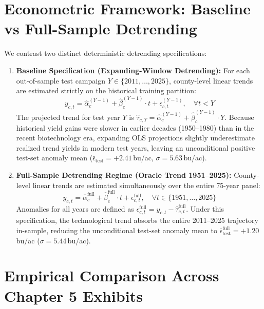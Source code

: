 \documentclass[11pt,a4paper]{article}
\begin{document}
\section{Econometric Framework: Baseline vs Full-Sample Detrending}

We contrast two distinct deterministic detrending specifications:
\begin{enumerate}
    \item \textbf{Baseline Specification (Expanding-Window Detrending):} For each out-of-sample test campaign $Y \in \{2011, \dots, 2025\}$, county-level linear trends are estimated strictly on the historical training partition:
    \begin{equation}
        y_{c,t} = \hat{\alpha}_{c}^{(Y-1)} + \hat{\beta}_{c}^{(Y-1)} \cdot t + \epsilon_{c,t}^{(Y-1)}, \quad \forall t < Y
    \end{equation}
    The projected trend for test year $Y$ is $\hat{\tau}_{c,Y} = \hat{\alpha}_{c}^{(Y-1)} + \hat{\beta}_{c}^{(Y-1)} \cdot Y$. Because historical yield gains were slower in earlier decades (1950--1980) than in the recent biotechnology era, expanding OLS projections slightly underestimate realized trend yields in modern test years, leaving an unconditional positive test-set anomaly mean ($\bar{\epsilon}_{\text{test}} = +2.41$\,bu/ac, $\sigma = 5.63$\,bu/ac).
    
    \item \textbf{Full-Sample Detrending Regime (Oracle Trend 1951--2025):} County-level linear trends are estimated simultaneously over the entire 75-year panel:
    \begin{equation}
        y_{c,t} = \hat{\alpha}_{c}^{\text{full}} + \hat{\beta}_{c}^{\text{full}} \cdot t + \epsilon_{c,t}^{\text{full}}, \quad \forall t \in \{1951, \dots, 2025\}
    \end{equation}
    Anomalies for all years are defined as $\epsilon_{c,t}^{\text{full}} = y_{c,t} - \hat{\tau}_{c,t}^{\text{full}}$. Under this specification, the technological trend absorbs the entire 2011--2025 trajectory in-sample, reducing the unconditional test-set anomaly mean to $\bar{\epsilon}_{\text{test}}^{\text{full}} = +1.20$\,bu/ac ($\sigma = 5.44$\,bu/ac).
\end{enumerate}

\section{Empirical Comparison Across Chapter 5 Exhibits}
\end{document}
